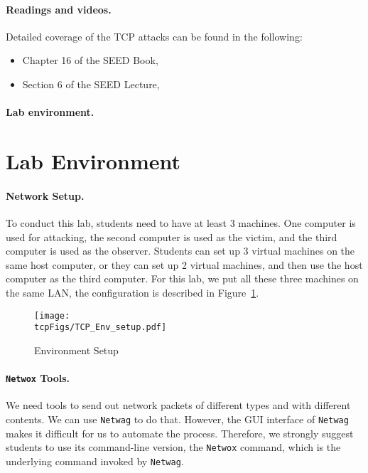 \paragraph{Readings and videos.}
Detailed coverage of the TCP attacks can be found in the following:

\begin{itemize}
\item Chapter 16 of the SEED Book, \seedbook
\item Section 6 of the SEED Lecture, \seedisvideo
\end{itemize}


\paragraph{Lab environment.} \seedenvironment



\section{Lab Environment}



\paragraph{Network Setup.}
To conduct this lab, students need to have at least 3 machines. One computer
is used for attacking, the second computer is used as the victim, and 
the third computer is used as the observer.
Students can set up 3 virtual machines on the same host computer, or they can set up
2 virtual machines, and then use the host computer as the third computer.
For this lab, we put all these three machines on the same LAN,
the configuration is described in Figure~\ref{tcp:fig:env}.



\begin{figure}[htb]
  \begin{center}
    \texttt{[image: \\tcpFigs/TCP\_Env\_setup.pdf]}
  \end{center}
  \caption{Environment Setup}
  \label{tcp:fig:env}
\end{figure}
 



\paragraph{{\tt Netwox} Tools.}
We need tools to send out network packets of different types and with different
contents. We can use {\tt Netwag} to do that. However, the GUI interface of {\tt Netwag} 
makes it difficult for us to automate the process. Therefore, we strongly 
suggest students to use its command-line version, the
{\tt Netwox} command, which is the underlying command invoked by {\tt Netwag}.  

